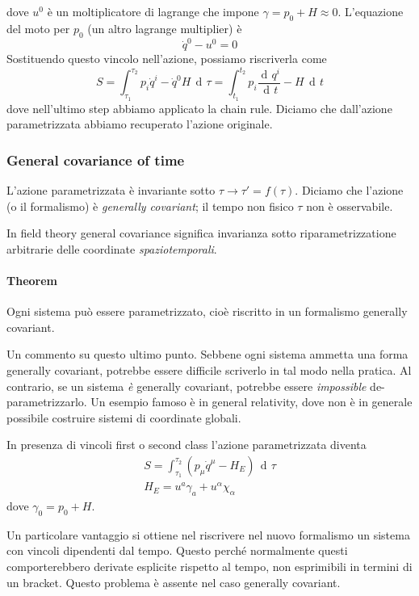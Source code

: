 \documentclass[a4paper, 11pt]{article}
\newcommand{\dd}{\mathop{\mathrm{d}\!}{}}
\newcommand{\deriv}[2]{\dfrac{\dd #1}{\dd #2}}
\begin{document}
	dove $u^0$ è un moltiplicatore di lagrange che impone $\gamma = p_0+H\approx 0$. L'equazione del moto per $p_0$ (un altro lagrange multiplier) è
	\begin{equation*}
	\dot{q}^0 - u^0 = 0
	\end{equation*}
	Sostituendo questo vincolo nell'azione, possiamo riscriverla come
	\begin{equation*}
	S = \int_{\tau_1}^{\tau_2} p_i \dot{q}^i - \dot{q}^0 H \, \dd \tau =
	\int_{t_1}^{t_2}  p_i\deriv{q^i}{t} - H  \, \dd t
	\end{equation*}
	dove nell'ultimo step abbiamo applicato la chain rule. Diciamo che dall'azione parametrizzata abbiamo recuperato l'azione originale.
	
	\subsubsection{General covariance of time}
	L'azione parametrizzata è invariante sotto $\tau \rightarrow \tau'=f(\tau)$. Diciamo che l'azione (o il formalismo) è \emph{generally covariant}; il tempo non fisico $\tau$ non è osservabile.
	
	In field theory general covariance significa invarianza sotto riparametrizzatione arbitrarie delle coordinate \emph{spaziotemporali}.
	
	\paragraph{Theorem} Ogni sistema può essere parametrizzato, cioè riscritto in un formalismo generally covariant.
	
	Un commento su questo ultimo punto. Sebbene ogni sistema ammetta una forma generally covariant, potrebbe essere difficile scriverlo in tal modo nella pratica. Al contrario, se un sistema \emph{è} generally covariant, potrebbe essere \emph{impossible} de-parametrizzarlo. Un esempio famoso è in general relativity, dove non è in generale possibile costruire sistemi di coordinate globali.
	
	\vspace{2mm}
	In presenza di vincoli first o second class l'azione parametrizzata diventa
	\begin{eqnarray}
	S = \int_{\tau_1}^{\tau_2} (p_\mu \dot{q}^\mu - H_E)\, \dd \tau \\
	H_E = u^a \gamma_a + u^\alpha \chi_\alpha
	\end{eqnarray}
	dove $\gamma_0 = p_0+H$.
	
	Un particolare vantaggio si ottiene nel riscrivere nel nuovo formalismo un sistema con vincoli dipendenti dal tempo. Questo perché normalmente questi comporterebbero derivate esplicite rispetto al tempo, non esprimibili in termini di un bracket. Questo problema è assente nel caso generally covariant.
	
\end{document}

